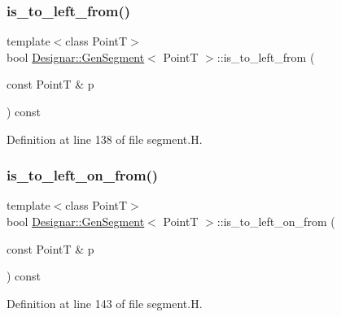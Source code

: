 \subsubsection{\texorpdfstring{is\+\_\+to\+\_\+left\+\_\+from()}{is\_to\_left\_from()}}
{\footnotesize\ttfamily template$<$class PointT$>$ \\
bool \hyperlink{class_designar_1_1_gen_segment}{Designar\+::\+Gen\+Segment}$<$ PointT $>$\+::is\+\_\+to\+\_\+left\+\_\+from (\begin{DoxyParamCaption}\item[{const PointT \&}]{p }\end{DoxyParamCaption}) const\hspace{0.3cm}{\ttfamily [inline]}}



Definition at line 138 of file segment.\+H.

\mbox{\label{class_designar_1_1_gen_segment_aae82d258fa7819459f3d6512ca349af0}} 
\subsubsection{\texorpdfstring{is\+\_\+to\+\_\+left\+\_\+on\+\_\+from()}{is\_to\_left\_on\_from()}}
{\footnotesize\ttfamily template$<$class PointT$>$ \\
bool \hyperlink{class_designar_1_1_gen_segment}{Designar\+::\+Gen\+Segment}$<$ PointT $>$\+::is\+\_\+to\+\_\+left\+\_\+on\+\_\+from (\begin{DoxyParamCaption}\item[{const PointT \&}]{p }\end{DoxyParamCaption}) const\hspace{0.3cm}{\ttfamily [inline]}}



Definition at line 143 of file segment.\+H.

\mbox{\label{class_designar_1_1_gen_segment_ad9f0ddae7b869161882185d5caeea5f8}} 
